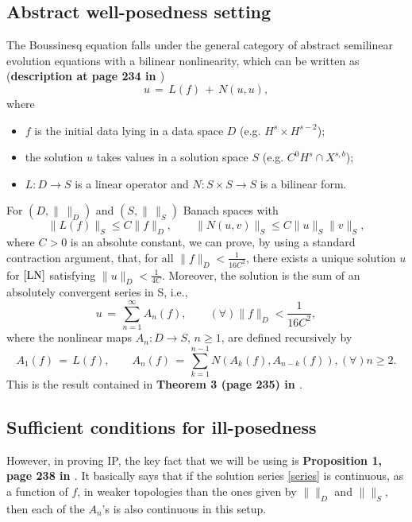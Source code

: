 \documentclass{amsart}
\begin{document}
\subsection{Abstract well-posedness setting} The Boussinesq equation falls under the general category of abstract semilinear evolution equations with a bilinear nonlinearity, which can be written as (\textbf{description at page 234 in \cite{Bejenaru-Tao-2006-Sharp-well-posedness-and-ill-posedness}})
\begin{equation}
u\,=\,L(f)\,+\,N(u,u),
\label{LN}
\end{equation}
where
\begin{itemize}

\item $f$ is the initial data lying in a data space $D$ (e.g. $H^s \times H^{s-2}$);

\item the solution $u$ takes values in a solution space $S$ (e.g. $C^0H^s \cap X^{s,b}$);

\item $L: D \to S$ is a linear operator  and $N:S\times S \to S$ is a bilinear form.  

\end{itemize} 

For $(D,\|\, \|_D)$ and $(S,\|\, \|_S)$ Banach spaces with 
\begin{equation}
\|L(f)\|_S \leq C \|f\|_D,\qquad \|N(u,v)\|_S \leq C \|u\|_S \|v\|_S,
\label{estim}
\end{equation}
where $C>0$ is an absolute constant, we can prove, by using a standard contraction argument, that, for all  $\|f\|_D<\frac{1}{16C^2}$, there exists a unique solution $u$ for $\eqref{LN}$ satisfying $\|u\|_D<\frac{1}{4C}$.  Moreover, the solution is the sum of an absolutely convergent series in S, i.e.,
\begin{equation}
u\,=\,\sum_{n=1}^{\infty} A_n(f), \qquad (\forall) \|f\|_D<\frac{1}{16C^2},
\label{series}
\end{equation}
where the nonlinear maps $A_n: D\to S$, $n\geq 1$, are defined recursively by
\begin{equation}
A_1(f)\,=\,L(f), \qquad A_n(f)\,=\,\sum_{k=1}^{n-1} N(A_k(f),A_{n-k}(f)), (\forall)n\geq 2.
\label{An}
\end{equation}
This is the result contained in \textbf{Theorem 3 (page 235) in \cite{Bejenaru-Tao-2006-Sharp-well-posedness-and-ill-posedness}}.

\subsection{Sufficient conditions for ill-posedness} However, in proving IP, the key fact that we will be using is \textbf{Proposition 1, page 238 in \cite{Bejenaru-Tao-2006-Sharp-well-posedness-and-ill-posedness}}. It basically says that if the solution series \eqref{series} is continuous, as a function of $f$, in  weaker topologies than the ones given by $\| \|_D$ and $\| \|_S$, then each of the $A_n$'s is also continuous in this setup.
\end{document}
